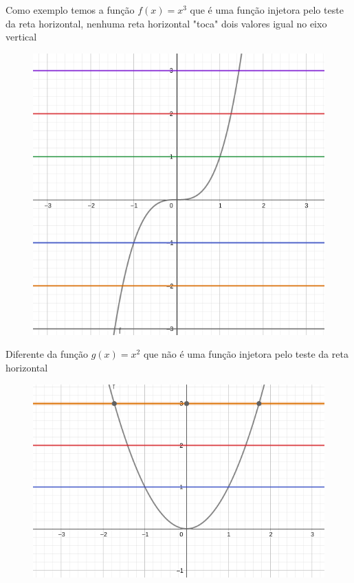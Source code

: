 \begin{multicols*}{2}
    Como exemplo temos a função $f(x) = x^3$ que é uma função injetora pelo teste da reta 					horizontal, nenhuma reta horizontal "toca" dois valores igual no eixo vertical
    \begin{figure}[H]
        \centering
        \includegraphics[scale=0.3]{assets/rafael/img37.png}
    \end{figure}

    Diferente da função $g(x) = x^2$ que não é uma função injetora pelo teste da reta horizontal

    \begin{figure}[H]
        \centering
        \includegraphics[scale=0.3]{assets/rafael/img38.png}
    \end{figure}


\end{multicols*}
